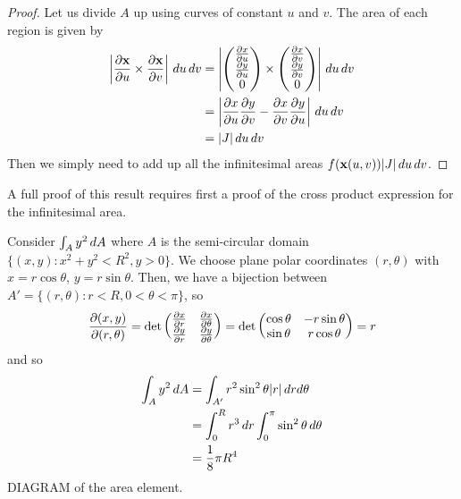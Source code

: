 \documentclass{../template/note}
\begin{document}
    \begin{proof}
        Let us divide \(A\) up using curves of constant \(u\) and \(v\). The area of each region is given by
        \begin{align*}
            \left|\pd{\V x}{u} \times \pd{\V x}{v}\right|\D u \D v &= \left|\begin{pmatrix}
             \pd x u \\
             \pd y u \\
             0 \\
            \end{pmatrix} \times \begin{pmatrix}
             \pd x v \\
             \pd y v \\
             0 \\
            \end{pmatrix}\right|\D u \D v \\
            &= \left|\pd x u \pd y v - \pd x v \pd y u\right|\D u \D v \\
            &= |J| \D u \D v
        \end{align*}
        Then we simply need to add up all the infinitesimal areas \(f(\V x(u, v)) |J| \D u \D v\).
    \end{proof}
    
    \begin{remark*}
        A full proof of this result requires first a proof of the cross product expression for the infinitesimal area.
    \end{remark*}
    
    \begin{example*}
        Consider \(\int_A y^2 \,d{A}\) where \(A\) is the semi-circular domain \(\{(x, y): x^2 + y^2 < R^2, y > 0\}\). We choose plane polar coordinates \((r, \theta)\) with \(x = r \cos \theta\), \(y = r \sin \theta\). Then, we have a bijection between \(A' = \{(r, \theta): r < R, 0 < \theta < \pi\}\), so
        \begin{align*}
            \pd{(x, y)}{(r, \theta)} = \det \begin{pmatrix}
                \pd x r & \pd x \theta \\
                \pd y r & \pd y \theta \\
            \end{pmatrix} = \det \begin{pmatrix}
                \cos \theta & -r \sin \theta \\
                \sin \theta & r \cos \theta \\
            \end{pmatrix} = r
        \end{align*}
        and so
        \begin{align*}
            \int_A y^2 \,d{A} &= \int_{A'} r^2 \sin^2 \theta |r| \,d{r} d\theta \\
            &= \int_0^R r^3 \,d{r} \int_0^\pi \sin^2 \theta \,d{\theta} \\
            &= \frac 1 8 \pi R^4
        \end{align*}
        DIAGRAM of the area element.        
    \end{example*}
    
\end{document}
